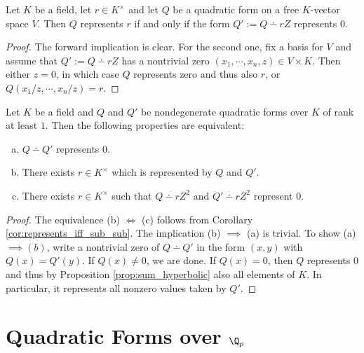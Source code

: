 \begin{corollary}\label{cor:represents_iff_sub_sub}
\leanok
Let $K$ be a field, let $r \in K^\times$ and let $Q$ be a quadratic form on a free $K$-vector space $V$. Then $Q$ represents $r$ if and only if the form $Q' := Q \dotminus rZ$ represents $0$.
\end{corollary}
\begin{proof}
The forward implication is clear. For the second one, fix a basis for $V$ and assume that $Q' := Q \dotminus rZ$ has a nontrivial zero $(x_1, \cdots, x_n, z) \in V \times K$. Then either $z = 0$, in which case $Q$ represents zero and thus also $r$, or $Q(x_1/z, \cdots, x_n/z) = r$.
\end{proof}

\begin{corollary}\label{cor:prod_isotropic_iff}
\leanok
Let $K$ be a field and $Q$ and $Q'$ be nondegenerate quadratic forms over $K$ of rank at least $1$. Then the following properties are equivalent:
\begin{enumerate}[a)]
\item $Q \dotminus Q'$ represents $0$.
\item There exists $r \in K^\times$ which is represented by $Q$ and $Q'$.
\item There exists $r \in K^\times$ such that $Q \dotminus rZ^2$ and $Q' \dotminus rZ^2$ represent $0$.
\end{enumerate}
\end{corollary}

\begin{proof}
The equivalence (b) $\iff$ (c) follows from Corollary \ref{cor:represents_iff_sub_sub}. The implication (b) $\implies$ (a) is trivial. To show (a) $\implies (b)$, write a nontrivial zero of $Q \dotminus Q'$ in the form $(x, y)$ with $Q(x) = Q'(y)$. If $Q(x) \ne 0$, we are done. If $Q(x) = 0$, then $Q$ represents $0$ and thus by Proposition \ref{prop:sum_hyperbolic} also all elements of $K$. In particular, it represents all nonzero values taken by $Q'$.
\end{proof}

\section[Quadratic Forms over the p-adics]{Quadratic Forms over $\Q_p$}\label{sec:quadratic_form_padic}

